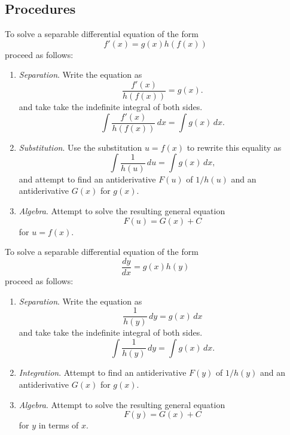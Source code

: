 
\subsection*{Procedures}
\begin{namedtheorem} To solve a separable differential equation of the form
  \[
  f'(x)=g(x)h(f(x))
  \]
  proceed as follows:
  \begin{enumerate}
    \item {\em Separation}. Write the equation as
    \[
    \frac{f'(x)}{h(f(x))}=g(x).
    \]
    and take take the indefinite integral of both sides.
    \[
    \int \frac{f'(x)}{h(f(x))}\, dx=\int g(x)\, dx.
    \]
    \item {\em Substitution}. Use the substitution $u=f(x)$ to rewrite this equality as
    \[
    \int \frac{1}{h(u)}\, du=\int g(x)\, dx,
    \]
    and attempt to find an antiderivative $F(u)$ of $1/h(u)$ and an antiderivative $G(x)$ for $g(x)$.
    \item {\em Algebra}. Attempt to solve the resulting general equation
    \[
    F(u)=G(x)+C
    \]
    for $u=f(x)$.


  \end{enumerate}

\end{namedtheorem}
\begin{namedtheorem} To solve a separable differential equation of the form
  \[
  \frac{dy}{dx}=g(x)h(y)
  \]
  proceed as follows:
  \begin{enumerate}
    \item {\em Separation}. Write the equation as
    \[
    \frac{1}{h(y)}\, dy=g(x)\, dx
    \]
    and take take the indefinite integral of both sides.
    \[
    \int \frac{1}{h(y)}\, dy=\int g(x)\, dx.
    \]
    \item {\em Integration}. Attempt to find an antiderivative $F(y)$ of $1/h(y)$ and an antiderivative $G(x)$ for $g(x)$.
    \item {\em Algebra}. Attempt to solve the resulting general equation
    \[
    F(y)=G(x)+C
    \]
    for $y$ in terms of $x$.


  \end{enumerate}

\end{namedtheorem}


